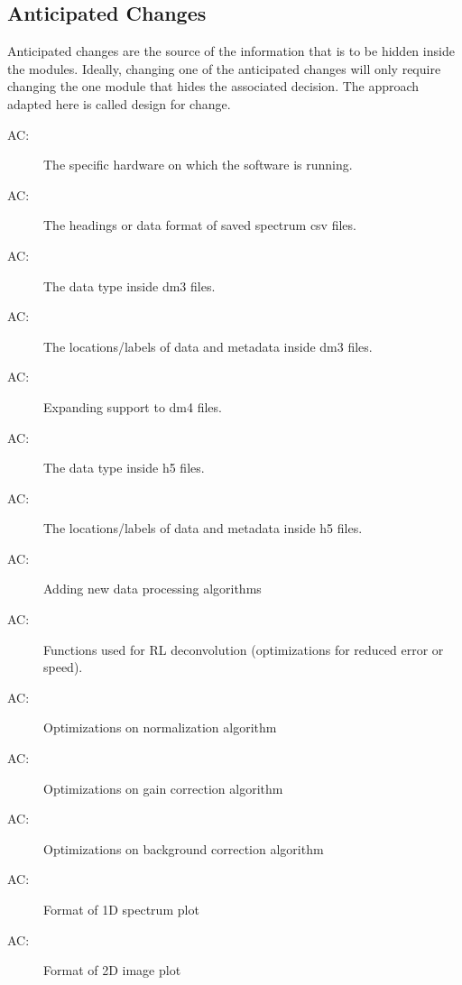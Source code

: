 \documentclass[12pt, titlepage]{article}
\newcounter{acnum}
\newcommand{\actheacnum}{AC\theacnum}
\begin{document}
\subsection{Anticipated Changes} \label{SecAchange}

Anticipated changes are the source of the information that is to be hidden
inside the modules. Ideally, changing one of the anticipated changes will only
require changing the one module that hides the associated decision. The approach
adapted here is called design for
change.

\begin{description}
	\item[ \actheacnum \label{acHardware}:] The specific
	  hardware on which the software is running.
	\item[ \actheacnum \label{acCSVheadings}:] The headings or data format of saved spectrum csv files.
	\item[ \actheacnum \label{acDM3datatype}:] The data type inside dm3 files.
	\item[ \actheacnum \label{acDM3labels}:] The locations/labels of data and metadata inside dm3 files.
	\item[ \actheacnum \label{acDM4support}:] Expanding support to dm4 files.
	\item[ \actheacnum \label{acH5datatype}:] The data type inside h5 files.
	\item[ \actheacnum \label{acH5labels}:] The locations/labels of data and metadata inside h5 files.
	\item[ \actheacnum \label{acNewDataProcessing}:] Adding new data processing algorithms
	\item[ \actheacnum \label{acRLoptimize}:] Functions used for RL deconvolution (optimizations for reduced error or speed).
	\item[ \actheacnum \label{acNorm}:] Optimizations on normalization algorithm
	\item[ \actheacnum \label{acGain}:] Optimizations on gain correction algorithm
	\item[ \actheacnum \label{acBkgnd}:] Optimizations on background correction algorithm
	\item[ \actheacnum \label{ac1DplotFormat}:] Format of 1D spectrum plot
	\item[ \actheacnum \label{ac2DplotFormat}:] Format of 2D image plot

\end{description}
\end{document}
